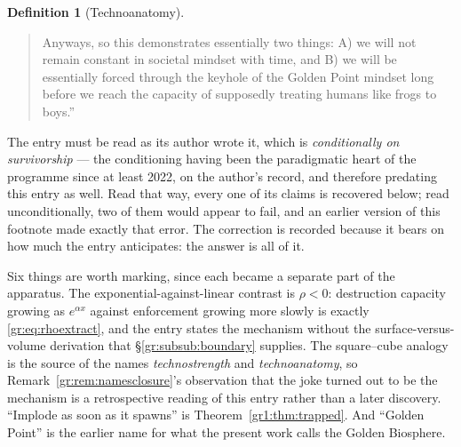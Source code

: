 \documentclass[11pt]{article}
\numberwithin{equation}{section}
\theoremstyle{plain}
\theoremstyle{definition}
\newtheorem{definition}[theorem]{Definition}
\theoremstyle{remark}
\begin{document}
\begin{definition}[Technoanatomy]
{\begin{quote}
Anyways, so this demonstrates essentially two things: A) we will not
remain constant in societal mindset with time, and B) we will be
essentially forced through the keyhole of the Golden Point mindset long
before we reach the capacity of supposedly treating humans like frogs to
boys.''
\end{quote}
The entry must be read as its author wrote it, which is
\emph{conditionally on survivorship} --- the conditioning having been the
paradigmatic heart of the programme since at least 2022, on the author's
record, and therefore predating this entry as well. Read that way, every
one of its claims is recovered below; read unconditionally, two of them
would appear to fail, and an earlier version of this footnote made
exactly that error. The correction is recorded because it bears on how
much the entry anticipates: the answer is all of it.

Six things are worth marking, since each became a separate part of the
apparatus. The exponential-against-linear contrast is
$\rho<0$: destruction capacity growing as $e^{\alpha x}$ against
enforcement growing more slowly is exactly
\eqref{gr:eq:rhoextract}, and the entry states the mechanism without the
surface-versus-volume derivation that \S\ref{gr:subsub:boundary}
supplies. The square--cube analogy is the source of the names
\emph{technostrength} and \emph{technoanatomy}, so
Remark~\ref{gr:rem:namesclosure}'s observation that the joke turned out
to be the mechanism is a retrospective reading of this entry rather than
a later discovery. ``Implode as soon as it spawns'' is
Theorem~\ref{gr1:thm:trapped}. And ``Golden Point'' is the earlier name
for what the present work calls the Golden Biosphere.

}
\end{definition}
\end{document}
